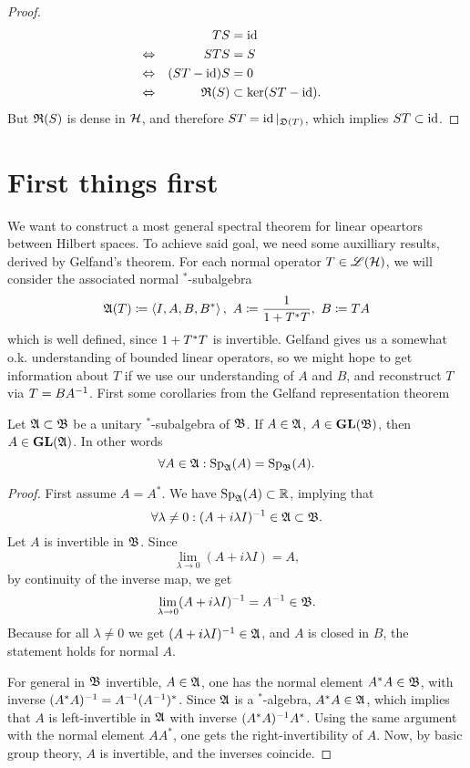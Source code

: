 \begin{proof}
 \begin{align*}
 &\quad & TS &= \operatorname{id} &\\
 &\Leftrightarrow & STS &= S &\\
 &\Leftrightarrow & (ST - \operatorname{id})S &= 0 &\\
 &\Leftrightarrow & \mathfrak{R}(S) &\subset \ker(ST - \operatorname{id}). & 
\end{align*}
 But $\mathfrak{R}(S)$ is dense in $\mathcal{H}$, and therefore $ST = \operatorname{id}|_{\mathfrak{D}(T)}$, which implies $ST \subset \operatorname{id}$.
\end{proof}




\section{First things first}
We want to construct a most general spectral theorem for linear opeartors between Hilbert spaces. To achieve said goal, we need some auxilliary results, derived by Gelfand's theorem. For each normal operator $T \in \mathscr{L}(\mathcal{H})$, we will consider the associated normal $^*$-subalgebra 
\[
 \mathfrak{A}(T) \coloneqq \left\langle I, A, B, B^* \right\rangle,~ A \coloneqq \frac{1}{1 + T ^{*} T}, ~ B \coloneqq TA
\]
which is well defined, since $1 + T ^{*} T$ is invertible. Gelfand gives us a somewhat o.k. understanding of bounded linear operators, so we might hope to get information about $T$ if we use our understanding of $A$ and $B$, and reconstruct $T$ via $T = BA^{-1}$.
\newline First some corollaries from the Gelfand representation theorem
\begin{prop}
 Let $\mathfrak{A} \subset \mathfrak{B}$ be a unitary $^*$-subalgebra of $\mathfrak{B}$. If $A \in \mathfrak{A}$, $A \in \operatorname{\mathbf{GL}}(\mathfrak{B})$, then $A \in \operatorname{\mathbf{GL}}(\mathfrak{A})$. In other words 
\[
  \forall A \in \mathfrak{A}: \operatorname{Sp}_{\mathfrak{A}}(A) = \operatorname{Sp}_{\mathfrak{B}}(A).
\]

\end{prop}
\begin{proof}
 First assume $A = A^* $. We have $\operatorname{Sp}_{\mathfrak{A}}(A) \subset \mathbb{R}$, implying that
 \[
  \forall \lambda \neq 0: (A + i \lambda I)^{-1} \in \mathfrak{A} \subset \mathfrak{B}.
 \]
 Let $A$ is invertible in $\mathfrak{B}$. Since 
 \[
  \lim_{\lambda \to 0} (A + i \lambda I) = A,
 \]
 by continuity of the inverse map, we get
 \[
  \lim_{\lambda \to 0} (A + i \lambda I) ^{-1} =A ^{-1} \in \mathfrak{B}.
 \]
Because for all $\lambda \neq 0$ we get $ (A + i \lambda I)^{-1} \in \mathfrak{A}$, and $A$ is closed in $B$, the statement  holds for normal $A$. 

For general in $\mathfrak{B}$ invertible, $A \in \mathfrak{A}$, one has the normal element $A^{*} A \in \mathfrak{B}$, with inverse $(A^{*} A)^{-1} = A^{-1} (A^{-1})^*$. Since $\mathfrak{A}$ is a $^*$-algebra, $A^{*} A \in \mathfrak{A}$, which implies that $A$ is left-invertible in $\mathfrak{A}$ with inverse $(A^{*} A)^{-1} A^*$. Using the same argument with the normal element $AA^*$, one gets the right-invertibility of $A$. Now, by basic group theory, $A$ is invertible, and the inverses coincide.
\end{proof}

